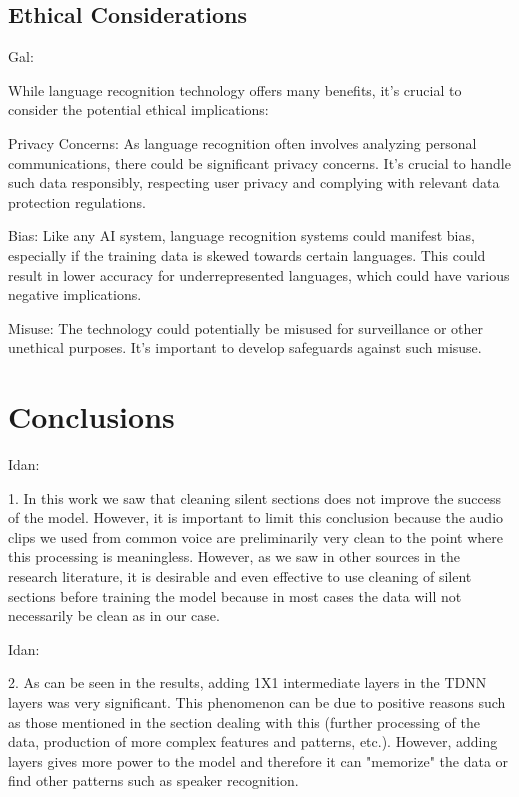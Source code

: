 \documentclass[a4paper]{article}
\begin{document}
\subsection{Ethical Considerations}

Gal:

While language recognition technology offers many benefits, it's crucial to consider the potential ethical implications:

Privacy Concerns: As language recognition often involves analyzing personal communications, there could be significant privacy concerns. It's crucial to handle such data responsibly, respecting user privacy and complying with relevant data protection regulations.

Bias: Like any AI system, language recognition systems could manifest bias, especially if the training data is skewed towards certain languages. This could result in lower accuracy for underrepresented languages, which could have various negative implications.

Misuse: The technology could potentially be misused for surveillance or other unethical purposes. It's important to develop safeguards against such misuse.

\section{Conclusions}

Idan:

1. In this work we saw that cleaning silent sections does not improve the success of the model. However, it is important to limit this conclusion because the audio clips we used from common voice are preliminarily very clean to the point where this processing is meaningless. However, as we saw in other sources in the research literature, it is desirable and even effective to use cleaning of silent sections before training the model because in most cases the data will not necessarily be clean as in our case.

Idan:

2. As can be seen in the results, adding 1X1 intermediate layers in the TDNN layers was very significant. This phenomenon can be due to positive reasons such as those mentioned in the section dealing with this (further processing of the data, production of more complex features and patterns, etc.). However, adding layers gives more power to the model and therefore it can "memorize" the data or find other patterns such as speaker recognition.
\end{document}
